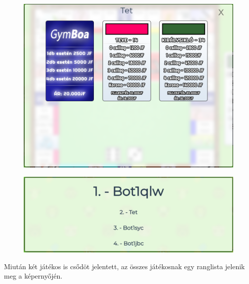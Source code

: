 \begin{figure}[h!]
\centering
\includegraphics[scale=0.4]{images/ca07dc6cdaa3b06f2ed463e12650af68.png}
\label{fig:ff}
\end{figure}


\begin{figure}[h!]
\centering
\includegraphics[scale=0.25]{images/ed4cc680904c8608d61522e3b3066dc1.png}
\label{fig:ff}
\end{figure}

Miután két játékos is csődöt jelentett, az összes játékosnak egy ranglista jelenik meg  a képernyőjén.